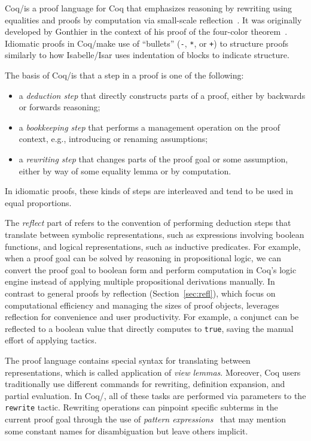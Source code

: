 Coq/\ssreflect is a proof language for Coq that emphasizes reasoning by rewriting using equalities and proofs by computation via small-scale reflection~\citep{Gonthier2010}. It was originally developed by Gonthier in the context of his proof of the four-color theorem~\citep{Gonthier2008}. Idiomatic proofs in Coq/\ssreflect make use of ``bullets'' (\lstinline{-}, \lstinline{*}, or \lstinline{+}) to structure proofs similarly to how Isabelle/Isar uses indentation of blocks to indicate structure.

The basis of Coq/\ssreflect is that a step in a proof is one of the following:
\begin{itemize}
\item a \emph{deduction step} that directly constructs parts of a proof, either by backwards or forwards reasoning;
\item a \emph{bookkeeping step} that performs a management operation on the proof context, e.g., introducing or renaming assumptions;
\item a \emph{rewriting step} that changes parts of the proof goal or some assumption, either by way of some equality lemma or by computation.
\end{itemize}
In idiomatic proofs, these kinds of steps are interleaved and tend to be used in equal proportions.

The \emph{reflect} part of \ssreflect refers to the convention of performing deduction steps that translate between symbolic representations, such as expressions involving boolean functions, and logical representations, such as inductive predicates. For example, when a proof goal can be solved by reasoning in propositional logic, we can convert the proof goal to boolean form and perform computation in Coq's logic engine instead of applying multiple propositional derivations manually. In contrast to general proofs by reflection (Section~\ref{sec:refl}), which focus on computational efficiency and managing the sizes of proof objects, \ssreflect leverages reflection for convenience and user productivity. For example, a conjunct can be reflected to a boolean value that directly computes to \lstinline{true}, saving the manual effort of applying tactics.

The proof language contains special syntax for translating between representations, which is called application of \emph{view lemmas}. Moreover, Coq users traditionally use different commands for rewriting, definition expansion, and partial evaluation. In Coq/\ssreflect, all of these tasks are performed via parameters to the \lstinline{rewrite} tactic. Rewriting operations can pinpoint specific subterms in the current proof goal through the use of \emph{pattern expressions}~\citep{Gonthier2012} that may mention some constant names for disambiguation but leave others implicit.

